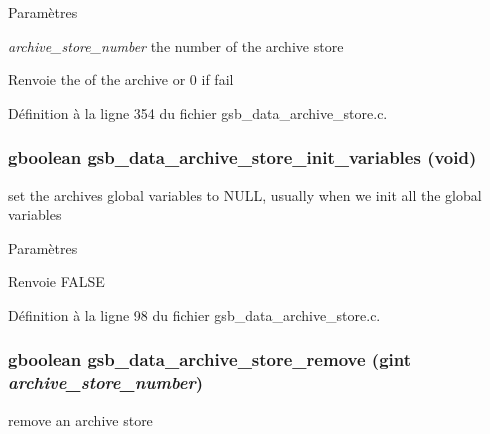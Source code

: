 \begin{DoxyParams}{Paramètres}
\item[{\em archive\_\-store\_\-number}]the number of the archive store\end{DoxyParams}
\begin{DoxyReturn}{Renvoie}
the of the archive or 0 if fail 
\end{DoxyReturn}


Définition à la ligne 354 du fichier gsb\_\-data\_\-archive\_\-store.c.

\subsubsection[{gsb\_\-data\_\-archive\_\-store\_\-init\_\-variables}]{\setlength{\rightskip}{0pt plus 5cm}gboolean gsb\_\-data\_\-archive\_\-store\_\-init\_\-variables (void)}\label{gsb__data__archive__store_8c_a92c3b325efef096b310d0b4303060fa8}
set the archives global variables to NULL, usually when we init all the global variables


\begin{DoxyParams}{Paramètres}
\item[{\em }]\end{DoxyParams}
\begin{DoxyReturn}{Renvoie}
FALSE 
\end{DoxyReturn}


Définition à la ligne 98 du fichier gsb\_\-data\_\-archive\_\-store.c.

\subsubsection[{gsb\_\-data\_\-archive\_\-store\_\-remove}]{\setlength{\rightskip}{0pt plus 5cm}gboolean gsb\_\-data\_\-archive\_\-store\_\-remove (gint {\em archive\_\-store\_\-number})}\label{gsb__data__archive__store_8c_a0054cc9c2f69b53c33e31fc81330052c}
remove an archive store



